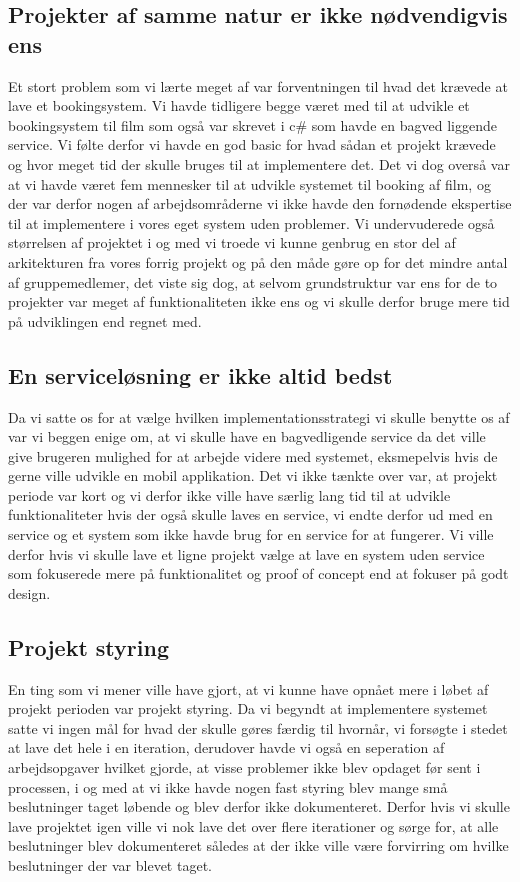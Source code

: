 \subsection{Projekter af samme natur er ikke nødvendigvis ens}
\label{Konklusion_Lessons_Projekt}
Et stort problem som vi lærte meget af var forventningen til hvad det krævede at lave et bookingsystem. Vi havde tidligere begge været med til at udvikle et bookingsystem til film som også var skrevet i c\# som havde en bagved liggende service. Vi følte derfor vi havde en god basic for hvad sådan et projekt krævede og hvor meget tid der skulle bruges til at implementere det. Det vi dog overså var at vi havde været fem mennesker til at udvikle systemet til booking af film, og der var derfor nogen af arbejdsområderne vi ikke havde den fornødende ekspertise til at implementere i vores eget system uden problemer. Vi undervuderede også størrelsen af projektet i og med vi troede vi kunne genbrug en stor del af arkitekturen fra vores forrig projekt og på den måde gøre op for det mindre antal af gruppemedlemer, det viste sig dog, at selvom grundstruktur var ens for de to projekter var meget af funktionaliteten ikke ens og vi skulle derfor bruge mere tid på udviklingen end regnet med.

\subsection{En serviceløsning er ikke altid bedst}
\label{Konklusion_Lessons_Service}
Da vi satte os for at vælge hvilken implementationsstrategi vi skulle benytte os af var vi beggen enige om, at vi skulle have en bagvedligende service da det ville give brugeren mulighed for at arbejde videre med systemet, eksmepelvis hvis de gerne ville udvikle en mobil applikation. Det vi ikke tænkte over var, at projekt periode var kort og vi derfor ikke ville have særlig lang tid til at udvikle funktionaliteter hvis der også skulle laves en service, vi endte derfor ud med en service og et system som ikke havde brug for en service for at fungerer.
Vi ville derfor hvis vi skulle lave et ligne projekt vælge at lave en system uden service som fokuserede mere på funktionalitet og proof of concept end at fokuser på godt design.

\subsection{Projekt styring}
\label{Konklusion_Lessons_Styring}
En ting som vi mener ville have gjort, at vi kunne have opnået mere i løbet af projekt perioden var projekt styring. Da vi begyndt at implementere systemet satte vi ingen mål for hvad der skulle gøres færdig til hvornår, vi forsøgte i stedet at lave det hele i en iteration, derudover havde vi også en seperation af arbejdsopgaver hvilket gjorde, at visse problemer ikke blev opdaget før sent i processen, i og med at vi ikke havde nogen fast styring blev mange små beslutninger taget løbende og blev derfor ikke dokumenteret. Derfor hvis vi skulle lave projektet igen ville vi nok lave det over flere iterationer og sørge for, at alle beslutninger blev dokumenteret således at der ikke ville være forvirring om hvilke beslutninger der var blevet taget.   
